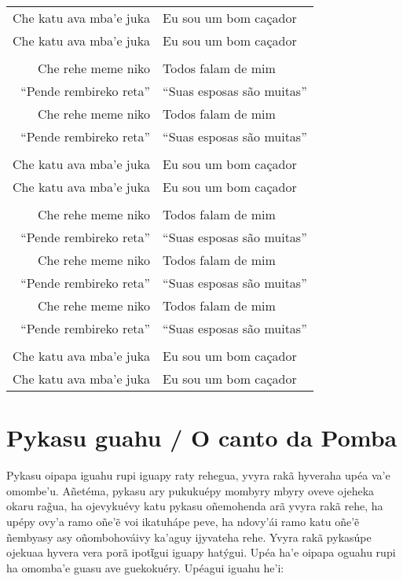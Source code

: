 \begin{table}[]
\begin{tabular}{rl}
Che katu ava mba'e juka          & Eu sou um bom caçador           \\
Che katu ava mba'e juka          & Eu sou um bom caçador           \\
                  &                     \\
Che rehe meme niko  		& Todos falam de mim \\
``Pende rembireko reta''          & ``Suas esposas são muitas''           \\
Che rehe meme niko          & Todos falam de mim           \\
``Pende rembireko reta''  		& ``Suas esposas são muitas'' \\
                  &                     \\
Che katu ava mba'e juka          & Eu sou um bom caçador           \\
Che katu ava mba'e juka          & Eu sou um bom caçador           \\                  
                  &                     \\
Che rehe meme niko  		& Todos falam de mim \\
``Pende rembireko reta''          & ``Suas esposas são muitas''           \\
Che rehe meme niko  		& Todos falam de mim \\
``Pende rembireko reta''          & ``Suas esposas são muitas''           \\
Che rehe meme niko  		& Todos falam de mim \\
``Pende rembireko reta''          & ``Suas esposas são muitas''           \\
                  &                     \\
Che katu ava mba'e juka          & Eu sou um bom caçador           \\
Che katu ava mba'e juka          & Eu sou um bom caçador           \\
\end{tabular}
\end{table}


\chapter{Pykasu guahu / O canto da Pomba}

Pykasu oipapa iguahu rupi iguapy raty rehegua, yvyra rakã hyveraha upéa
va'e omombe'u. Añetéma, pykasu ary pukukuépy mombyry mbyry oveve ojeheka
okaru rag̃ua, ha ojevykuévy katu pykasu oñemohenda arã yvyra rakã rehe,
ha upépy ovy'a ramo oñe'ẽ voi ikatuhápe peve, ha ndovy'ái ramo katu
oñe'ẽ ñembyasy asy oñombohováivy ka'aguy ijyvateha rehe. Yvyra rakã
pykasúpe ojekuaa hyvera vera porã ipotῖgui iguapy hatýgui. Upéa ha'e
oipapa oguahu rupi ha omomba'e guasu ave guekokuéry. Upéagui iguahu
he'i:

